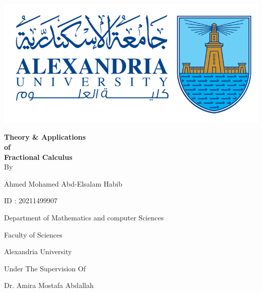 \newpage
\thispagestyle{empty}

\begingroup
{}
\begin{center}
    \includegraphics[scale=.5]{collage logo.png}
    \vspace*{1cm}
    \par
    {\fontsize{20pt}{30pt}\selectfont
        {\fontsize{30pt}{40pt}\selectfont
        \textbf{Theory \& Applications \\ of \\ Fractional Calculus}
        }
        \\
        \vspace*{.75cm}
        By
        \vspace*{.75cm}

        Ahmed Mohamed Abd-Elsalam Habib

        ID : 20211499907

        Department of Mathematics and computer Sciences

        Faculty of Sciences

        Alexandria University

        \vspace*{\fill}
        Under The Supervision Of
        
        Dr. Amira Mostafa Abdallah
    }
\end{center}
\restoregeometry
\endgroup
\newpage
\thispagestyle{empty}
\vspace*{-2cm}
\tableofcontents
\thispagestyle{empty}
\newpage
{}
\setcounter{page}{1}